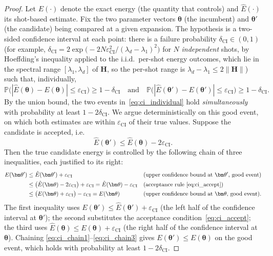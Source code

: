 \documentclass[11pt]{article}
\theoremstyle{plain}
\theoremstyle{plain}
\newcommand{\bbP}{\mathbb{P}}
\begin{document}
\begin{proof}
Let $E(\cdot)$ denote the exact energy (the quantity that
 controls) and $\hat{E}(\cdot)$ its shot-based
estimate.  Fix the two parameter vectors $\bm\theta$ (the incumbent) and
$\bm\theta'$ (the candidate) being compared at a given expansion.  The
hypothesis is a two-sided confidence interval at each point: there is a
failure probability $\delta_{\mathrm{CI}}\in(0,1)$ (for example,
$\delta_{\mathrm{CI}}=2\exp \bigl(-2N\varepsilon_{\mathrm{CI}}^2/(\lambda_d-\lambda_1)^2\bigr)$
for $N$ \emph{independent} shots, by Hoeffding's inequality applied to the
i.i.d.\ per-shot energy outcomes, which lie in the spectral range
$[\lambda_1,\lambda_d]$ of $\mathbf{H}$, so the per-shot range is
$\lambda_d-\lambda_1\le 2\|\mathbf{H}\|$) such that, individually,
\begin{equation}\label{eq:ci_individual}
  \bbP\bigl(|\hat{E}(\bm\theta)-E(\bm\theta)|
            \le\varepsilon_{\mathrm{CI}}\bigr)\ge 1-\delta_{\mathrm{CI}}
  \quad\text{and}\quad
  \bbP\bigl(|\hat{E}(\bm\theta')-E(\bm\theta')|
            \le\varepsilon_{\mathrm{CI}}\bigr)\ge 1-\delta_{\mathrm{CI}} .
\end{equation}
By the union bound, the two events in~\eqref{eq:ci_individual} hold
\emph{simultaneously} with probability at least
$1-2\delta_{\mathrm{CI}}$.  We argue deterministically on this
good event, on which both estimates are within
$\varepsilon_{\mathrm{CI}}$ of their true values.  Suppose the
candidate is accepted, i.e.
\begin{equation}\label{eq:ci_accept}
  \hat{E}(\bm\theta')\le\hat{E}(\bm\theta)-2\varepsilon_{\mathrm{CI}} .
\end{equation}
Then the true candidate energy is controlled by the following chain of
three inequalities, each justified to its right:
\begin{align}
  E(\bm\theta')
  &\le\hat{E}(\bm\theta')+\varepsilon_{\mathrm{CI}}
  &&\text{(upper confidence bound at $\bm\theta'$, good event)}
  \label{eq:ci_chain1}\\
  &\le\bigl(\hat{E}(\bm\theta)-2\varepsilon_{\mathrm{CI}}\bigr)
      +\varepsilon_{\mathrm{CI}}
   =\hat{E}(\bm\theta)-\varepsilon_{\mathrm{CI}}
  &&\text{(acceptance rule~\eqref{eq:ci_accept})}
  \label{eq:ci_chain2}\\
  &\le\bigl(E(\bm\theta)+\varepsilon_{\mathrm{CI}}\bigr)
      -\varepsilon_{\mathrm{CI}}
   =E(\bm\theta)
  &&\text{(upper confidence bound at $\bm\theta$, good event).}
  \label{eq:ci_chain3}
\end{align}
The first inequality uses
$E(\bm\theta')\le\hat{E}(\bm\theta')+\varepsilon_{\mathrm{CI}}$ (the
left half of the confidence interval at $\bm\theta'$); the second
substitutes the acceptance condition~\eqref{eq:ci_accept}; the third
uses $\hat{E}(\bm\theta)\le E(\bm\theta)+\varepsilon_{\mathrm{CI}}$ (the
right half of the confidence interval at $\bm\theta$).  Chaining
\eqref{eq:ci_chain1}--\eqref{eq:ci_chain3} gives
$E(\bm\theta')\le E(\bm\theta)$ on the good event, which holds with
probability at least $1-2\delta_{\mathrm{CI}}$.
\end{proof}
\end{document}
